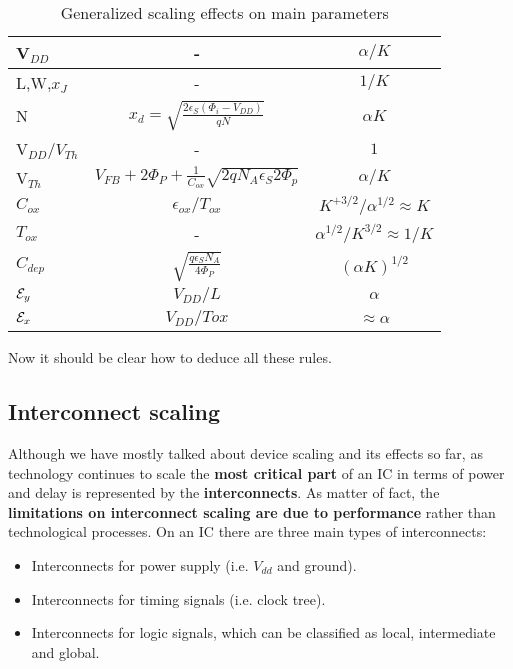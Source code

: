 \documentclass[a4paper, 12pt, twoside, openright]{report}
\begin{document}
\begin{enumerate}
\begin{table}[H]
{
   \begin{center}
  {
     \begin{tabular}{||l||c|c||}\hline
      V$_{DD}$ & -& $ {\alpha/K}$\\
      \hline
      L,W,$x_J$       &- & $ {1/K}$\\
      \hline
      N & $x_d=\sqrt{\frac{2\epsilon_S(\Phi_i-V_{DD})}{qN}}$&$ {\alpha K}$ \\
      \hline
      V$_{DD}/V_{Th}$ &- & ${1}$\\
      \hline
      V$_{Th}$ & $V_{FB}+2\Phi_P+\frac{1}{C_{ox}}\sqrt{2qN_A\epsilon_S 2\Phi_p}$  & $ {\alpha/K}$\\
      \hline
       $C_{ox}$&  $\epsilon_{ox}/T_{ox}$ &$ {K}^{+3/2}/\alpha^{1/2}\approx K $\\ 
      \hline
      $T_{ox}$       &- & $ {\alpha^{1/2}/{K}^{3/2}}\approx 1/K$\\
      \hline
       $C_{dep}$&  $\sqrt{\frac{q\epsilon_SN_A}{4\Phi_P}}$ &$ {(\alpha K)}^{1/2}$\\ 
      \hline
      ${\cal E}_y$ & $V_{DD}/L$ & $ {\alpha}$\\
      \hline
      ${\cal E}_x$ & $V_{DD}/Tox$ & $ {\approx \alpha}$\\
      \hline
     \end{tabular}
}
\caption{Generalized scaling effects on main parameters}
    \end{center}
}
\end{table}

Now it should be clear how to deduce all these rules.

\end{enumerate}

\newpage

\subsection{Interconnect scaling}
Although we have mostly talked about device scaling and its effects so far, as technology continues to scale the \textbf{most critical part} of an IC in terms of power and delay is represented by the \textbf{interconnects}. As matter of fact, the \textbf{limitations on interconnect scaling are due to performance} rather than technological processes. On an IC there are three main types of interconnects: 

\begin{itemize}
\item Interconnects for power supply (i.e. $V_{dd}$ and ground).
\item Interconnects for timing signals (i.e. clock tree).
\item Interconnects for logic signals, which can be classified as local, intermediate and global.
\end{itemize}
\end{document}
